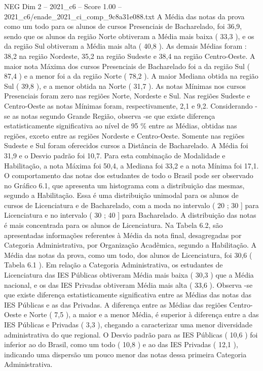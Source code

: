 \begin{textsample}{NEG Dim 2 – 2021\_c6 – Score 1.00 – 2021\_c6/enade\_2021\_ci\_comp\_9c8a31e088.txt}
A Média das notas da prova como um todo para os alunos de cursos Presenciais de Bacharelado, foi 36,9, sendo que os alunos da região Norte obtiveram a Média mais baixa ( 33,3 ), e os da região Sul obtiveram a Média mais alta ( 40,8 ).
As demais Médias foram : 38,2 na região Nordeste, 35,2 na região Sudeste e 38,4 na região Centro-Oeste.
A maior nota Máxima dos cursos Presenciais de Bacharelado foi a da região Sul ( 87,4 ) e a menor foi a da região Norte ( 78,2 ).
A maior Mediana obtida na região Sul ( 39,8 ), e a menor obtida na Norte ( 31,7 ).
As notas Mínimas nos cursos Presenciais foram zero nas regiões Norte, Nordeste e Sul.
Nas regiões Sudeste e Centro-Oeste as notas Mínimas foram, respectivamente, 2,1 e 9,2.
Considerando -se as notas segundo Grande Região, observa -se que existe diferença estatisticamente significativa ao nível de 95 \% entre as Médias, obtidas nas regiões, exceto entre as regiões Nordeste e Centro-Oeste.
Somente nas regiões Sudeste e Sul foram oferecidos cursos a Distância de Bacharelado.
A Média foi 31,9 e o Desvio padrão foi 10,7.
Para esta combinação de Modalidade e Habilitação, a nota Máxima foi 50,4, a Mediana foi 33,2 e a nota Mínima foi 17,1.
O comportamento das notas dos estudantes de todo o Brasil pode ser observado no Gráfico 6.1, que apresenta um histograma com a distribuição das mesmas, segundo a Habilitação.
Essa é uma distribuição unimodal para os alunos de cursos de Licenciatura e de Bacharelado, com a moda no intervalo ( 20 ; 30 ] para Licenciatura e no intervalo ( 30 ; 40 ] para Bacharelado.
A distribuição das notas é mais concentrada para os alunos de Licenciatura.
Na Tabela 6.2, são apresentadas informações referentes à Média da nota final, desagregadas por Categoria Administrativa, por Organização Acadêmica, segundo a Habilitação.
A Média das notas da prova, como um todo, dos alunos de Licenciatura, foi 30,6 ( Tabela 6.1 ).
Em relação a Categoria Administrativa, os estudantes de Licenciatura das IES Públicas obtiveram Média mais baixa ( 30,3 ) que a Média nacional, e os das IES Privadas obtiveram Média mais alta ( 33,6 ).
Observa -se que existe diferença estatisticamente significativa entre as Médias das notas das IES Públicas e as das Privadas.
A diferença entre as Médias das regiões Centro-Oeste e Norte ( 7,5 ), a maior e a menor Média, é superior à diferença entre a das IES Públicas e Privadas ( 3,3 ), chegando a caracterizar uma menor diversidade administrativa do que regional.
O Desvio padrão para as IES Públicas ( 10,6 ) foi inferior ao do Brasil, como um todo ( 10,8 ) e ao das IES Privadas ( 12,1 ), indicando uma dispersão um pouco menor das notas dessa primeira Categoria Administrativa.

\end{textsample}
